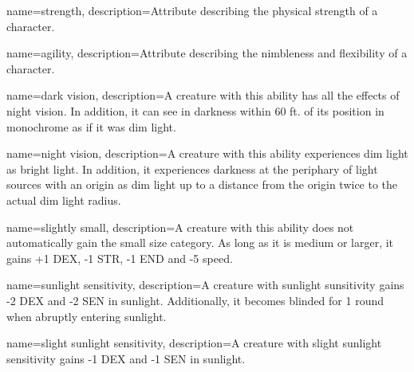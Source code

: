 {
    name=strength,
    description={Attribute describing the physical strength of a character.}
}

{
    name=agility,
    description={Attribute describing the nimbleness and flexibility of a
        character.}
}

{
    name={dark vision},
    description={A creature with this ability has all the effects of night
        vision. In addition, it can see in darkness within 60 ft. of its
        position in monochrome as if it was dim light.}
}

{
    name={night vision},
    description={A creature with this ability experiences dim light as bright
        light. In addition, it experiences darkness at the periphary of light
        sources with an origin as dim light up to a distance from the origin 
        twice to the actual dim light radius.}
}

{
    name={slightly small},
    description={A creature with this ability does not automatically gain the
        small size category. As long as it is medium or larger, it gains +1
        DEX, -1 STR, -1 END and -5 speed.}
}

{
    name={sunlight sensitivity},
    description={A creature with sunlight sunsitivity gains -2 DEX and -2 SEN
        in sunlight. Additionally, it becomes blinded for 1 round when abruptly
        entering sunlight.}
}

{
    name={slight sunlight sensitivity},
    description={A creature with slight sunlight sensitivity gains -1 DEX and
        -1 SEN in sunlight.}
}
